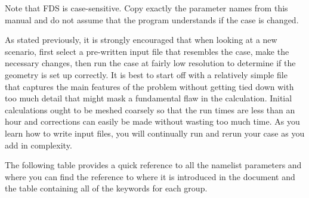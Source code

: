 \documentclass[11pt]{book}
\begin{document}
\begin{warning}
\noindent
Note that FDS is case-sensitive. Copy
exactly the parameter names from this manual and do not assume that the
program understands if the case is changed.
\end{warning}

As stated previously, it is strongly encouraged that when looking at a new scenario,
first select a pre-written input file that resembles the case,
make the necessary changes, then run the case at fairly low
resolution to determine if the geometry is set up correctly.
It is best to start off with a relatively simple file that captures the main
features of the problem without getting tied down with too much detail that
might mask a fundamental flaw in the calculation. Initial calculations ought
to be meshed coarsely so that the run times are less than an hour and
corrections can easily be made without wasting too much time.
As you learn how to write input files, you will continually
run and rerun your case as you add in complexity.

The following table provides a quick reference to all the namelist parameters and
where you can find the reference to where it is introduced in the document and the
table containing all of the keywords for each group.
\end{document}
